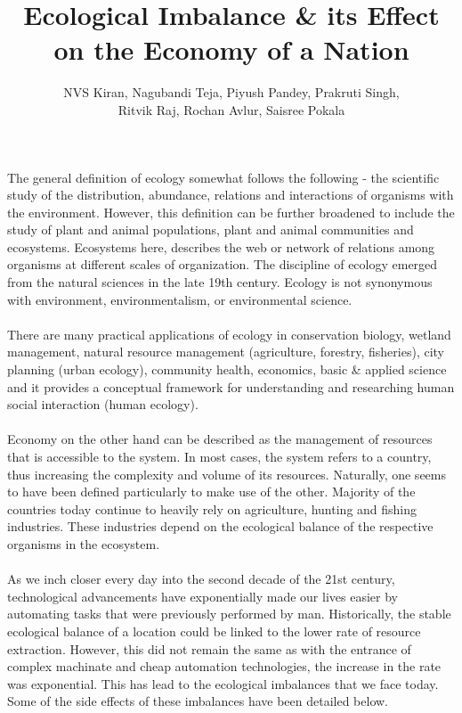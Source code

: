 \documentclass[10pt]{article}
\title{Ecological Imbalance \& its Effect on the Economy of a Nation}
\author{NVS Kiran, Nagubandi Teja, Piyush Pandey, Prakruti Singh,\\
 Ritvik Raj, Rochan Avlur, Saisree Pokala}
\date{\displaydate{date}}
\begin{document}
\maketitle

The general definition of ecology somewhat follows the following - the scientific study of the distribution, abundance, relations and interactions of organisms with the environment. However, this definition can be further broadened to include the study of plant and animal populations, plant and animal communities and ecosystems. Ecosystems here, describes the web or network of relations among organisms at different scales of organization. The discipline of ecology emerged from the natural sciences in the late 19th century. Ecology is not synonymous with environment, environmentalism, or environmental science.
\\
\\
There are many practical applications of ecology in conservation biology, wetland management, natural resource management (agriculture, forestry, fisheries), city planning (urban ecology), community health, economics, basic \& applied science and it provides a conceptual framework for understanding and researching human social interaction (human ecology).
\\
\\
Economy on the other hand can be described as the management of resources that is accessible to the system. In most cases, the system refers to a country, thus increasing the complexity and volume of its resources. Naturally, one seems to have been defined particularly to make use of the other. Majority of the countries today continue to heavily rely on agriculture, hunting and fishing industries. These industries depend on the ecological balance of the respective organisms in the ecosystem.
\\
\\
As we inch closer every day into the second decade of the 21st century, technological advancements have exponentially made our lives easier by automating tasks that were previously performed by man. Historically, the stable ecological balance of a location could be linked to the lower rate of resource extraction. However, this did not remain the same as with the entrance of complex machinate and cheap automation technologies, the increase in the rate was exponential. This has lead to the ecological imbalances that we face today. Some of the side effects of these imbalances have been detailed below. 
\\
\\
\end{document}
